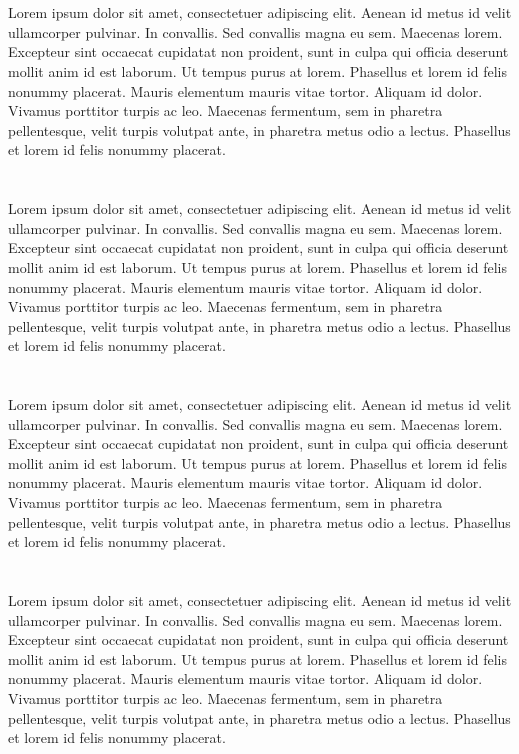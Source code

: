 \section*{\CilPrace}
Lorem ipsum dolor sit amet, consectetuer adipiscing elit. Aenean id metus id velit ullamcorper pulvinar. In convallis. Sed convallis magna eu sem. Maecenas lorem. Excepteur sint occaecat cupidatat non proident, sunt in culpa qui officia deserunt mollit anim id est laborum. Ut tempus purus at lorem. Phasellus et lorem id felis nonummy placerat. Mauris elementum mauris vitae tortor. Aliquam id dolor. Vivamus porttitor turpis ac leo. Maecenas fermentum, sem in pharetra pellentesque, velit turpis volutpat ante, in pharetra metus odio a lectus. Phasellus et lorem id felis nonummy placerat.

\section*{\PouziteMetody}
Lorem ipsum dolor sit amet, consectetuer adipiscing elit. Aenean id metus id velit ullamcorper pulvinar. In convallis. Sed convallis magna eu sem. Maecenas lorem. Excepteur sint occaecat cupidatat non proident, sunt in culpa qui officia deserunt mollit anim id est laborum. Ut tempus purus at lorem. Phasellus et lorem id felis nonummy placerat. Mauris elementum mauris vitae tortor. Aliquam id dolor. Vivamus porttitor turpis ac leo. Maecenas fermentum, sem in pharetra pellentesque, velit turpis volutpat ante, in pharetra metus odio a lectus. Phasellus et lorem id felis nonummy placerat.

\section*{\Vysledky}
Lorem ipsum dolor sit amet, consectetuer adipiscing elit. Aenean id metus id velit ullamcorper pulvinar. In convallis. Sed convallis magna eu sem. Maecenas lorem. Excepteur sint occaecat cupidatat non proident, sunt in culpa qui officia deserunt mollit anim id est laborum. Ut tempus purus at lorem. Phasellus et lorem id felis nonummy placerat. Mauris elementum mauris vitae tortor. Aliquam id dolor. Vivamus porttitor turpis ac leo. Maecenas fermentum, sem in pharetra pellentesque, velit turpis volutpat ante, in pharetra metus odio a lectus. Phasellus et lorem id felis nonummy placerat.

\section*{\PrinosAutora}
Lorem ipsum dolor sit amet, consectetuer adipiscing elit. Aenean id metus id velit ullamcorper pulvinar. In convallis. Sed convallis magna eu sem. Maecenas lorem. Excepteur sint occaecat cupidatat non proident, sunt in culpa qui officia deserunt mollit anim id est laborum. Ut tempus purus at lorem. Phasellus et lorem id felis nonummy placerat. Mauris elementum mauris vitae tortor. Aliquam id dolor. Vivamus porttitor turpis ac leo. Maecenas fermentum, sem in pharetra pellentesque, velit turpis volutpat ante, in pharetra metus odio a lectus. Phasellus et lorem id felis nonummy placerat.
